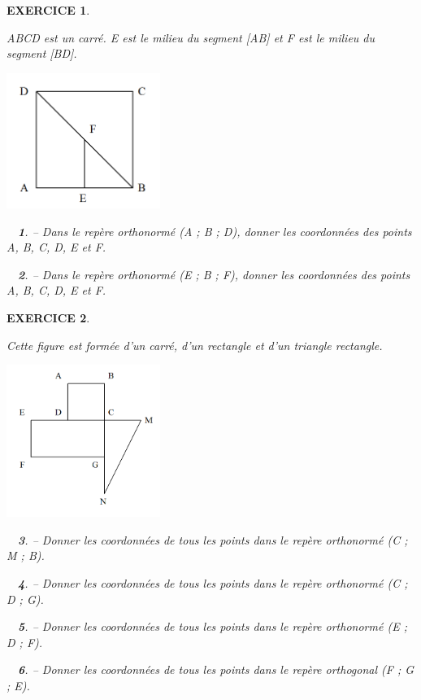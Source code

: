 \documentclass[a4paper]{article}   %
\renewcommand{\(}{\left(}
\renewcommand{\)}{\right)}
\newtheorem{ques}{~}
\newenvironment{qu}{\begin{ques}--} {\end{ques}}
\newtheorem{EXO}{\large EXERCICE }
\newenvironment{EX}   { \setcounter{ques}{0} \begin{EXO} \hrulefill ~\vspace{0.3cm}

\normalfont}    {\end{EXO} \medskip}
\begin{document}
\begin{center} 		%
\end{center}


\begin{EX}
ABCD est un carré. E est le milieu du segment [AB] et F est le milieu du segment [BD]. 
\begin{center}
\includegraphics[width=5cm]{2ex1.png} 
\end{center}
\begin{qu} Dans le repère orthonormé (A ; B ; D), donner les coordonnées des points A, B, C, D, E et F. \end{qu}
\begin{qu} Dans le repère orthonormé (E ; B ; F), donner les coordonnées des points A, B, C, D, E et F.\end{qu}
\end{EX}

\begin{EX} \setcounter{ques}{0}
Cette figure est formée d’un carré, d’un rectangle et d’un triangle rectangle. 
\begin{center}
\includegraphics[width=5cm]{2ex2.png} 
\end{center}
\begin{qu} Donner les coordonnées de tous les points dans le repère orthonormé (C ; M ; B).\end{qu}
\begin{qu} Donner les coordonnées de tous les points dans le repère orthonormé (C ; D ; G).\end{qu}
\begin{qu} Donner les coordonnées de tous les points dans le repère orthonormé (E ; D ; F).\end{qu}
\begin{qu} Donner les coordonnées de tous les points dans le repère orthogonal (F ; G ; E).\end{qu}
\end{EX}
\end{document}
